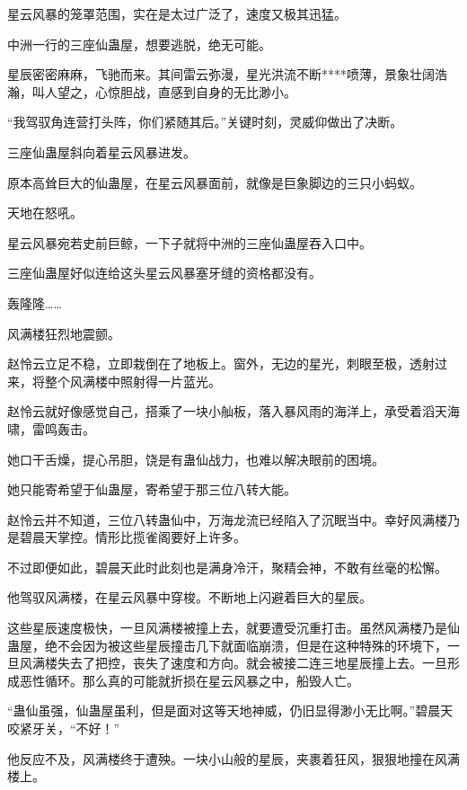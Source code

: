 
\begin{this_body}

星云风暴的笼罩范围，实在是太过广泛了，速度又极其迅猛。

中洲一行的三座仙蛊屋，想要逃脱，绝无可能。

星辰密密麻麻，飞驰而来。其间雷云弥漫，星光洪流不断****喷薄，景象壮阔浩瀚，叫人望之，心惊胆战，直感到自身的无比渺小。

“我驾驭角连营打头阵，你们紧随其后。”关键时刻，灵威仰做出了决断。

三座仙蛊屋斜向着星云风暴进发。

原本高耸巨大的仙蛊屋，在星云风暴面前，就像是巨象脚边的三只小蚂蚁。

天地在怒吼。

星云风暴宛若史前巨鲸，一下子就将中洲的三座仙蛊屋吞入口中。

三座仙蛊屋好似连给这头星云风暴塞牙缝的资格都没有。

轰隆隆……

风满楼狂烈地震颤。

赵怜云立足不稳，立即栽倒在了地板上。窗外，无边的星光，刺眼至极，透射过来，将整个风满楼中照射得一片蓝光。

赵怜云就好像感觉自己，搭乘了一块小舢板，落入暴风雨的海洋上，承受着滔天海啸，雷鸣轰击。

她口干舌燥，提心吊胆，饶是有蛊仙战力，也难以解决眼前的困境。

她只能寄希望于仙蛊屋，寄希望于那三位八转大能。

赵怜云并不知道，三位八转蛊仙中，万海龙流已经陷入了沉眠当中。幸好风满楼乃是碧晨天掌控。情形比揽雀阁要好上许多。

不过即便如此，碧晨天此时此刻也是满身冷汗，聚精会神，不敢有丝毫的松懈。

他驾驭风满楼，在星云风暴中穿梭。不断地上闪避着巨大的星辰。

这些星辰速度极快，一旦风满楼被撞上去，就要遭受沉重打击。虽然风满楼乃是仙蛊屋，绝不会因为被这些星辰撞击几下就面临崩溃，但是在这种特殊的环境下，一旦风满楼失去了把控，丧失了速度和方向。就会被接二连三地星辰撞上去。一旦形成恶性循环。那么真的可能就折损在星云风暴之中，船毁人亡。

“蛊仙虽强，仙蛊屋虽利，但是面对这等天地神威，仍旧显得渺小无比啊。”碧晨天咬紧牙关，“不好！”

他反应不及，风满楼终于遭殃。一块小山般的星辰，夹裹着狂风，狠狠地撞在风满楼上。


\end{this_body}
